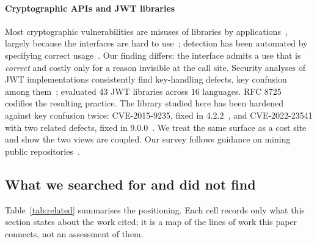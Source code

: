 \documentclass[preprint,12pt,authoryear]{elsarticle}
\begin{document}
\paragraph{Cryptographic APIs and JWT libraries} Most cryptographic
vulnerabilities are misuses of libraries by applications~\citep{lazar2014why,egele2013empirical},
largely because the interfaces are hard to use~\citep{nadi2016jumping};
detection has been automated by specifying correct
usage~\citep{kruger2018crysl,rahaman2019cryptoguard}. Our finding differs: the
interface admits a use that is \emph{correct} and costly only for a reason
invisible at the call site. Security analyses of JWT implementations
consistently find key-handling defects, key confusion among
them~\citep{detering2017jose,xu2023jwtkey}; \citet{yang2026tokentimebomb}
evaluated 43 JWT libraries across 16 languages. RFC
8725~\citep{rfc8725} codifies the resulting practice. The library studied here
has been hardened against key confusion twice: CVE-2015-9235, fixed in
4.2.2~\citep{ghsa2015jsonwebtoken}, and CVE-2022-23541 with two related
defects, fixed in 9.0.0~\citep{auth0bulletin2022}. We treat the same surface
as a cost site and show the two views are coupled. Our survey follows
guidance on mining public repositories~\citep{kalliamvakou2014promises}.

\subsection{What we searched for and did not find}\label{sec:gaps}

Table~\ref{tab:related} summarises the positioning. Each cell records only what
this section states about the work cited; it is a map of the lines of work this
paper connects, not an assessment of them.
\end{document}
